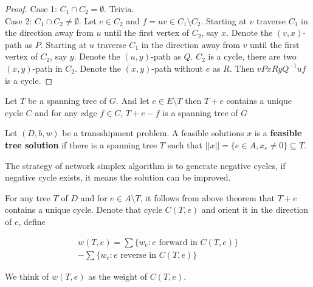 				\begin{proof}
					Case 1: $C_1 \cap C_2 = \emptyset$. Trivia.\\
					Case 2: $C_1 \cap C_2 \neq \emptyset$. Let $e\in C_2$ and $f=uv \in C_1 \setminus C_2$. Starting at $v$ traverse $C_1$ in the direction away from $u$ until the first vertex of $C_2$, say $x$. Denote the $(v, x)$-path as $P$. Starting at $u$ traverse $C_1$ in the direction away from $v$ until the first vertex of $C_2$, say $y$. Denote the $(u, y)$-path as $Q$. $C_2$ is a cycle, there are two $(x, y)$-path in $C_2$. Denote the $(x, y)$-path without $e$ as $R$. Then $vPxRyQ^{-1}uf$ is a cycle.
				\end{proof}

				\begin{theorem}
					Let $T$ be a spanning tree of $G$. And let $e\in E\setminus T$ then $T+e$ contains a unique cycle $C$ and for any edge $f\in C$, $T+e-f$ is a spanning tree of $G$
				\end{theorem}

				Let $(D, b, w)$ be a transshipment problem. A feasible solutions $x$ is a \textbf{feasible tree solution} if there is a spanning tree $T$ such that $||x|| = \{e\in A, x_e\neq 0\} \subseteq T$.

				The strategy of network simplex algorithm is to generate negative cycles, if negative cycle exists, it means the solution can be improved.

				For any tree $T$ of $D$ and for $e\in A\setminus T$, it follows from above theorem that $T+e$ contains a unique cycle. Denote that cycle $C(T, e)$ and orient it in the direction of $e$, define 

				\begin{eqnarray}
					w(T, e) = \sum\{w_e: e \text{ forward in } C(T, e)\} \nonumber \\ 
							- \sum\{w_e: e \text{ reverse in } C(T, e)\}
				\end{eqnarray}

				We think of $w(T, e)$ as the weight of $C(T,e)$.

